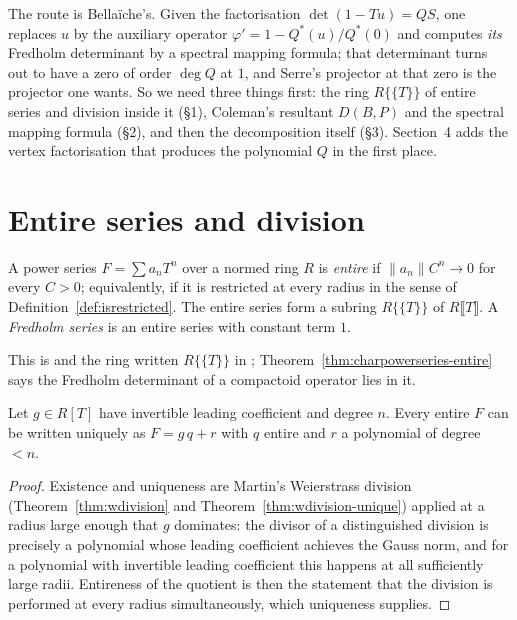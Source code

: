 The route is Bella\"iche's.  Given the factorisation $\det(1-Tu) = QS$, one replaces $u$ by the
auxiliary operator $\varphi' = 1 - Q^{*}(u)/Q^{*}(0)$ and computes \emph{its} Fredholm
determinant by a spectral mapping formula; that determinant turns out to have a zero of order
$\deg Q$ at $1$, and Serre's projector at that zero is the projector one wants.  So we need
three things first: the ring $R\{\{T\}\}$ of entire series and division inside it (\S1),
Coleman's resultant $D(B,P)$ and the spectral mapping formula (\S2), and then the decomposition
itself (\S3).  Section~4 adds the vertex factorisation that produces the polynomial $Q$ in the
first place.

\section{Entire series and division}

\begin{definition}
  \label{def:isentire}
  \leanok
  A power series $F = \sum a_n T^n$ over a normed ring $R$ is \emph{entire} if
  $\lVert a_n\rVert C^n \to 0$ for every $C > 0$; equivalently, if it is restricted at every
  radius in the sense of Definition~\ref{def:isrestricted}.  The entire series form a subring
  $R\{\{T\}\}$ of $R\llbracket T\rrbracket$.  A \emph{Fredholm series} is an entire series with
  constant term $1$.
\end{definition}

This is \cite[Definition II.1.16]{Bellaiche} and the ring written $R\{\{T\}\}$ in
\cite[\S2.1]{JN}; Theorem~\ref{thm:charpowerseries-entire} says the Fredholm determinant of a
compactoid operator lies in it.

\begin{theorem}
  \label{thm:entire-division}
  \leanok
  Let $g \in R[T]$ have invertible leading coefficient and degree $n$.  Every entire $F$ can be
  written uniquely as $F = g\,q + r$ with $q$ entire and $r$ a polynomial of degree $< n$.
\end{theorem}

\begin{proof}
  \leanok
  Existence and uniqueness are Martin's Weierstrass division (Theorem~\ref{thm:wdivision} and
  Theorem~\ref{thm:wdivision-unique}) applied at a radius large enough that $g$ dominates: the
  divisor of a distinguished division is precisely a polynomial whose leading coefficient
  achieves the Gauss norm, and for a polynomial with invertible leading coefficient this happens
  at all sufficiently large radii.  Entireness of the quotient is then the statement that the
  division is performed at every radius simultaneously, which uniqueness supplies.
\end{proof}

